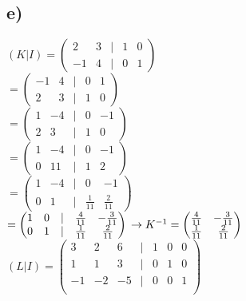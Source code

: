 \subsection*{e)}
$
(K | I) =
\begin{pmatrix}
2 & 3 & | & 1 & 0 \\
-1 & 4 & | & 0 & 1
\end{pmatrix}$
\\
$=
\begin{pmatrix}
-1 & 4 & | & 0 & 1 \\
2 & 3 & | & 1 & 0
\end{pmatrix}$
\\
$=
\begin{pmatrix}
1 & -4 & | & 0 & -1 \\
2 & 3 & | & 1 & 0
\end{pmatrix}$
\\
$=
\begin{pmatrix}
1 & -4 & | & 0 & -1 \\
0 & 11 & | & 1 & 2
\end{pmatrix}$
\\
$=
\begin{pmatrix}
1 & -4 & | & 0 & -1 \\
0 & 1 & | & \frac{1}{11} & \frac{2}{11}
\end{pmatrix}$
\\
$=
\begin{pmatrix}
1 & 0 & | & \frac{4}{11} & -\frac{3}{11} \\
0 & 1 & | & \frac{1}{11} & \frac{2}{11}
\end{pmatrix}\\
\rightarrow K^{-1} = \begin{pmatrix}
\frac{4}{11} & -\frac{3}{11} \\
\frac{1}{11} & \frac{2}{11}
\end{pmatrix}
$\\
$
(L | I ) =
\begin{pmatrix}
3 & 2 & 6 & | & 1 & 0 & 0 \\
1 & 1 & 3 & | & 0 & 1 & 0 \\
-1 & -2 & -5 & | & 0 & 0 & 1 \\
\end{pmatrix}
$\\
